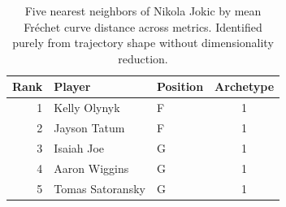 \begin{table}[htbp]
  \centering\small
  \begin{tabular}{rllc}
    \toprule
    Rank & Player & Position & Archetype \\
    \midrule
    1 & Kelly Olynyk & F & 1 \\
    2 & Jayson Tatum & F & 1 \\
    3 & Isaiah Joe & G & 1 \\
    4 & Aaron Wiggins & G & 1 \\
    5 & Tomas Satoransky & G & 1 \\
    \bottomrule
  \end{tabular}
  \caption{Five nearest neighbors of Nikola Jokic by mean Fr\'{e}chet curve distance across metrics. Identified purely from trajectory shape without dimensionality reduction.}
  \label{tab:Nikola_Jokic_frechet_curve_neighbors}
\end{table}

